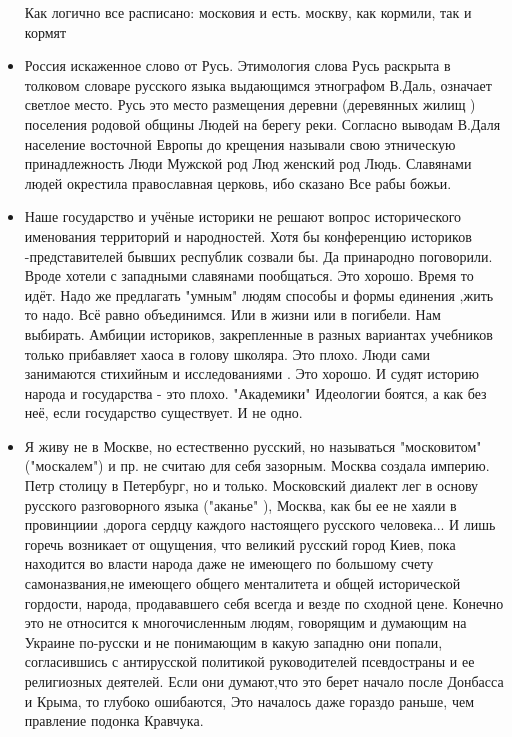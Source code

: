 \begin{itemize}
Как логично все расписано: московия и есть. москву, как кормили, так и кормят

\item {}

Россия искаженное слово от Русь. Этимология слова Русь раскрыта в
толковом словаре русского языка выдающимся этнографом В.Даль, означает
светлое место. Русь это место размещения деревни (деревянных жилищ )
поселения родовой общины Людей на берегу реки. Согласно выводам В.Даля
население восточной Европы до крещения называли свою этническую
принадлежность Люди Мужской род Люд женский род Людь. Славянами людей
окрестила православная церковь, ибо сказано Все рабы божьи.

\item {}

Наше государство и учёные историки не решают вопрос исторического
именования территорий и народностей. Хотя бы конференцию историков
-представителей бывших республик созвали бы. Да принародно поговорили.
Вроде хотели с западными славянами пообщаться. Это хорошо. Время то
идёт. Надо же предлагать "умным" людям способы и формы единения ,жить
то надо. Всё равно объединимся. Или в жизни или в погибели. Нам
выбирать. Амбиции историков, закрепленные в разных вариантах учебников
только прибавляет хаоса в голову школяра. Это плохо. Люди сами
занимаются стихийным и исследованиями . Это хорошо. И судят историю
народа и государства - это плохо. "Академики" Идеологии боятся, а как
без неё, если государство существует. И не одно.

\item {}

Я живу не в Москве, но естественно русский, но называться "московитом"
("москалем") и пр. не считаю для себя зазорным. Москва создала империю. Петр
столицу в Петербург, но и только. Московский диалект лег в основу русского
разговорного языка ("аканье" ), Москва, как бы ее не хаяли в провинциии ,дорога
сердцу каждого настоящего русского человека... И лишь горечь возникает от
ощущения, что великий русский город Киев, пока находится во власти народа даже
не имеющего по большому счету самоназвания,не имеющего общего менталитета и
общей исторической гордости, народа, продававшего себя всегда и везде по сходной
цене. Конечно это не относится к многочисленным людям, говорящим и думающим на
Украине по-русски и не понимающим в какую западню они попали, согласившись с
антирусской политикой руководителей псевдостраны и ее религиозных деятелей. Если
они думают,что это берет начало после Донбасса и Крыма, то глубоко
ошибаются, Это началось даже гораздо раньше, чем правление подонка Кравчука.


\end{itemize}
